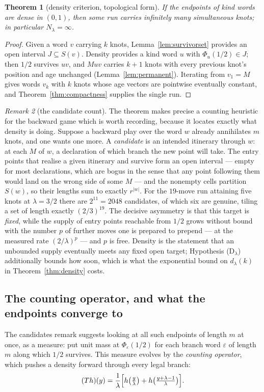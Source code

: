 \documentclass[11pt,reqno]{amsart}
\theoremstyle{plain}
\newtheorem{theorem}{Theorem}
\theoremstyle{definition}
\theoremstyle{remark}
\newtheorem{remark}[theorem]{Remark}
\begin{document}
\begin{theorem}[density criterion, topological form]\label{thm:density0}
If the endpoints of kind words are dense in $(0,1)$, then some run carries
infinitely many simultaneous knots; in particular $N_\lambda=\infty$.
\end{theorem}

\begin{proof}
Given a word $v$ carrying $k$ knots, Lemma~\ref{lem:survivorset} provides an
open interval $J\subseteq S(v)$. Density provides a kind word $u$ with
$\Phi_u(1/2)\in J$; then $1/2$ survives $uv$, and $Muv$ carries $k+1$ knots
with every previous knot's position and age unchanged
(Lemma~\ref{lem:permanent}). Iterating from $v_1=M$ gives words $v_k$ with
$k$ knots whose age vectors are pointwise eventually constant, and
Theorem~\ref{thm:compactness} supplies the single run.
\end{proof}

\begin{remark}[the candidate count]\label{rem:candidates}
The theorem makes precise a counting heuristic for the backward game which is
worth recording, because it locates exactly what density is doing. Suppose a
backward play over the word $w$ already annihilates $m$ knots, and one wants
one more. A \emph{candidate} is an intended itinerary through $w$: at each $M$
of $w$, a declaration of which branch the new point will take. The entry
points that realise a given itinerary and survive form an open interval ---
empty for most declarations, which are bogus in the sense that any point
following them would land on the wrong side of some $M$ --- and the nonempty
cells partition $S(w)$, so their lengths sum to exactly $r^{|w|}$. For the
$19$-move run attaining five knots at $\lambda=3/2$ there are $2^{11}=2048$
candidates, of which six are genuine, tiling a set of length exactly
$(2/3)^{19}$. The decisive asymmetry is that this target is \emph{fixed},
while the supply of entry points reachable from $1/2$ grows without bound with
the number $p$ of further moves one is prepared to prepend --- at the measured
rate $(2/\lambda)^p$ --- and $p$ is free. Density is the statement that an
unbounded supply eventually meets any fixed open target; Hypothesis
(D$_\lambda$) additionally bounds how soon, which is what the exponential
bound on $d_\lambda(k)$ in Theorem~\ref{thm:density} costs.
\end{remark}

\subsection{The counting operator, and what the endpoints converge to}
The candidates remark suggests looking at all such endpoints of length $m$ at
once, as a measure: put unit mass at $\Phi_\varepsilon(1/2)$ for each branch
word $\varepsilon$ of length $m$ along which $1/2$ survives. This measure evolves by the \emph{counting operator}, which pushes
a density forward through every legal branch:
\[
  (Th)(y)=\frac1\lambda\Bigl[h\bigl(\tfrac y\lambda\bigr)
  +h\bigl(\tfrac{y+\lambda-1}\lambda\bigr)\Bigr].
\]
\end{document}
